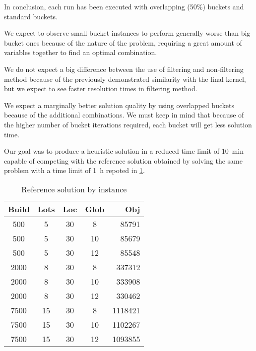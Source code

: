 \documentclass[a4paper, twocolumn, oneside, 10pt]{article}
\begin{document}
In conclusion, each run has been executed with overlapping (50\%) buckets and standard buckets.

We expect to observe small bucket instances to perform generally worse than big bucket ones because of the nature of the problem, requiring a great amount of variables together to find an optimal combination.

We do not expect a big difference between the use of filtering and non-filtering method because of the previously demonstrated similarity with the final kernel, but we expect to see faster resolution times in filtering method.

We expect a marginally better solution quality by using overlapped buckets because of the additional combinations. We must keep in mind that because of the higher number of bucket iterations required, each bucket will get less solution time.

Our goal was to produce a heuristic solution in a reduced time limit of \SI{10}{\minute} capable of competing with the reference solution obtained by solving the same problem with a time limit of \SI{1}{\hour} repoted in \cref{tab:reference}.


\begin{table}
	\centering
	\caption{Reference solution by instance}\label{tab:reference}
	\begin{tabular}{|ccccr|}
		\hline \textbf{Build} & \textbf{Lots} & \textbf{Loc} & \textbf{Glob} & \textbf{Obj} \\
		\hline 500 & 5 & 30 & 8 & 85791 \\
		500 & 5 & 30 & 10 & 85679 \\
		500 & 5 & 30 & 12 & 85548 \\
		2000 & 8 & 30 & 8 & 337312 \\
		2000 & 8 & 30 & 10 & 333908 \\
		2000 & 8 & 30 & 12 & 330462 \\
		7500 & 15 & 30 & 8 & 1118421 \\
		7500 & 15 & 30 & 10 & 1102267 \\
		7500 & 15 & 30 & 12 & 1093855 \\
		\hline
	\end{tabular}
\end{table}
\end{document}
